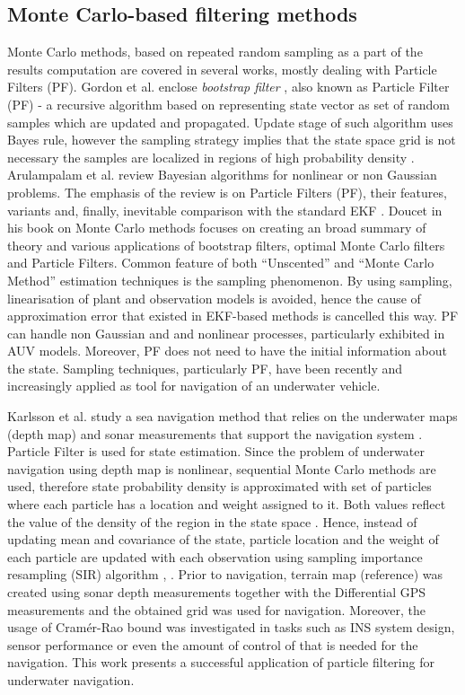 \subsection{Monte Carlo-based filtering methods}
Monte Carlo methods, based on repeated random sampling as a part of the results computation are covered in several works, mostly dealing with Particle Filters (PF). Gordon et al. enclose \textit{bootstrap filter} \cite{gordon93}, also known as Particle Filter (PF) - a recursive algorithm based on representing state vector as set of random samples which are updated and propagated. Update stage of such algorithm uses Bayes rule, however the sampling strategy implies that the state space grid is not necessary the samples are localized in regions of high probability density \cite{gordon93}. Arulampalam et al. review Bayesian algorithms for nonlinear or non Gaussian problems. The emphasis of the review is on Particle Filters (PF), their features, variants and, finally, inevitable comparison with the standard EKF \cite{arulampalam02}. Doucet in his book on Monte Carlo methods \cite{doucet01} focuses on creating an broad summary of theory and various applications of bootstrap filters, optimal Monte Carlo filters and Particle Filters. Common feature of both ``Unscented'' and ``Monte Carlo Method'' estimation techniques is the sampling phenomenon. By using sampling, linearisation of plant and observation models is avoided, hence the cause of approximation error that existed in EKF-based methods is cancelled this way. PF can handle non Gaussian and and nonlinear processes, particularly exhibited in AUV models. Moreover, PF does not need to have the initial information about the state. Sampling techniques, particularly PF, have been recently and increasingly applied as tool for navigation of an underwater vehicle.

Karlsson et al. study a sea navigation method that relies on the underwater maps (depth map) and sonar measurements that support the navigation system \cite{karlsson02}. Particle Filter is used for state estimation. Since the problem of underwater navigation using depth map is nonlinear, sequential Monte Carlo methods are used, therefore state probability density is approximated with set of particles where each particle has a location and weight assigned to it. Both values reflect the value of the density of the region in the state space \cite{karlsson02}. Hence, instead of updating mean and covariance of the state, particle location and the weight of each particle are updated with each observation using sampling importance resampling (SIR) algorithm \cite{karlsson02}, \cite{gordon93}. Prior to navigation, terrain map (reference) was created using sonar depth measurements together with the Differential GPS measurements and the obtained grid was used for navigation. Moreover, the usage of Cram\'{e}r-Rao bound was investigated in tasks such as INS system design, sensor performance or even the amount of control of that is needed for the navigation. This work presents a successful application of particle filtering for underwater navigation.

